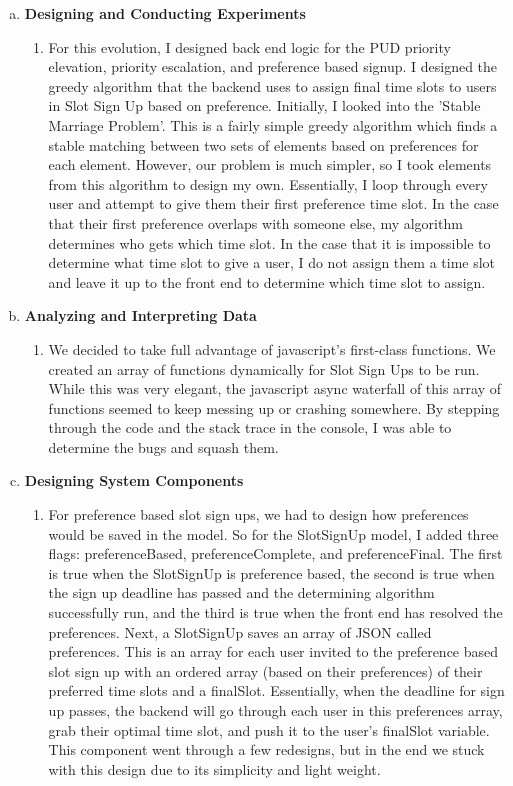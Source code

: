 \documentclass[11pt]{article}   %
\begin{document}
\begin{enumerate} [a)]
\item  {\bf Designing and Conducting Experiments}
\begin{enumerate} [$\cdot$]
\item For this evolution, I designed back end logic for the PUD priority elevation, priority escalation, and preference based signup. I designed the greedy algorithm that the backend uses to assign final time slots to users in Slot Sign Up based on preference.  Initially, I looked into the 'Stable Marriage Problem'. This is a fairly simple greedy algorithm which finds a stable matching between two sets of elements based on preferences for each element. However, our problem is much simpler, so I took elements from this algorithm to design my own.  Essentially, I loop through every user and attempt to give them their first preference time slot.  In the case that their first preference overlaps with someone else, my algorithm determines who gets which time slot. In the case that it is impossible to determine what time slot to give a user, I do not assign them a time slot and leave it up to the front end to determine which time slot to assign.
\end{enumerate}
\item  {\bf Analyzing and Interpreting Data}
\begin{enumerate} [$\cdot$]
\item We decided to take full advantage of javascript's first-class functions. We created an array of functions dynamically for Slot Sign Ups to be run. While this was very elegant, the javascript async waterfall of this array of functions seemed to keep messing up or crashing somewhere. By stepping through the code and the stack trace in the console, I was able to determine the bugs and squash them.
\end{enumerate}
\item {\bf Designing System Components}
\begin{enumerate} [$\cdot$]
\item For preference based slot sign ups, we had to design how preferences would be saved in the model. So for the SlotSignUp model, I added three flags: preferenceBased, preferenceComplete, and preferenceFinal.  The first is true when the SlotSignUp is preference based, the second is true when the sign up deadline has passed and the determining algorithm successfully run, and the third is true when the front end has resolved the preferences.  Next, a SlotSignUp saves an array of JSON called preferences. This is an array for each user invited to the preference based slot sign up with an ordered array (based on their preferences) of their preferred time slots and a finalSlot. Essentially, when the deadline for sign up passes, the backend will go through each user in this preferences array, grab their optimal time slot, and push it to the user's finalSlot variable. This component went through a few redesigns, but in the end we stuck with this design due to its simplicity and light weight.

\end{enumerate}
\end{enumerate}
\end{document}

